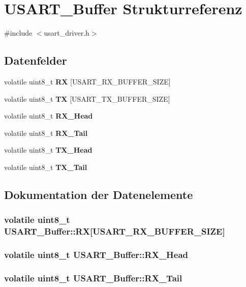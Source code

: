 \section{USART\_\-Buffer Strukturreferenz}
\label{struct_u_s_a_r_t___buffer}


{\ttfamily \#include $<$usart\_\-driver.h$>$}

\subsection*{Datenfelder}
\begin{DoxyCompactItemize}
\item 
volatile uint8\_\-t {\bf RX} [USART\_\-RX\_\-BUFFER\_\-SIZE]
\item 
volatile uint8\_\-t {\bf TX} [USART\_\-TX\_\-BUFFER\_\-SIZE]
\item 
volatile uint8\_\-t {\bf RX\_\-Head}
\item 
volatile uint8\_\-t {\bf RX\_\-Tail}
\item 
volatile uint8\_\-t {\bf TX\_\-Head}
\item 
volatile uint8\_\-t {\bf TX\_\-Tail}
\end{DoxyCompactItemize}


\subsection{Dokumentation der Datenelemente}
\subsubsection[{RX}]{\setlength{\rightskip}{0pt plus 5cm}volatile uint8\_\-t {\bf USART\_\-Buffer::RX}[USART\_\-RX\_\-BUFFER\_\-SIZE]}\label{struct_u_s_a_r_t___buffer_a4fb1273a1ca2da7f8c2f458796f60657}
\subsubsection[{RX\_\-Head}]{\setlength{\rightskip}{0pt plus 5cm}volatile uint8\_\-t {\bf USART\_\-Buffer::RX\_\-Head}}\label{struct_u_s_a_r_t___buffer_aa789becdf6a9d0084d259e81855944f4}
\subsubsection[{RX\_\-Tail}]{\setlength{\rightskip}{0pt plus 5cm}volatile uint8\_\-t {\bf USART\_\-Buffer::RX\_\-Tail}}\label{struct_u_s_a_r_t___buffer_ad909d06be7c6bf2cdfa6737e274e4b35}

